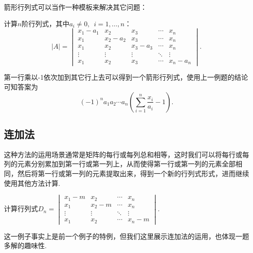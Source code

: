 箭形行列式可以当作一种模板来解决其它问题：

\begin{example}{}{}
    计算$n$阶行列式，其中$a_i\neq 0,\enspace i=1,\ldots,n$：
    \[|A|=\begin{vmatrix}
            x_1-a_1 & x_2     & x_3     & \cdots & x_n     \\
            x_1     & x_2-a_2 & x_3     & \cdots & x_n     \\
            x_1     & x_2     & x_3-a_3 & \cdots & x_n     \\
            \vdots  & \vdots  & \vdots  & \ddots & \vdots  \\
            x_1     & x_2     & x_3     & \cdots & x_n-a_n
        \end{vmatrix}.\]
\end{example}

\begin{solution}
    第一行乘以-1依次加到其它行上去可以得到一个箭形行列式，使用上一例题的结论可知答案为\[(-1)^na_1a_2\cdots a_n(\sum\limits_{i=1}^n\dfrac{x_i}{a_i}-1).\]
\end{solution}

\subsection{连加法}

这种方法的运用场景通常是矩阵的每行或每列总和相等，这时我们可以将每行或每列的元素分别累加到第一行或第一列上，从而使得第一行或第一列的元素全部相同，然后将第一行或第一列的元素提取出来，得到一个新的行列式形式，进而继续使用其他方法计算.

\begin{example}{}{}
    计算行列式$D_n=\begin{vmatrix}
            x_1-m  & x_2    & \cdots & x_n    \\
            x_1    & x_2-m  & \cdots & x_n    \\
            \vdots & \vdots & \ddots & \vdots \\
            x_1    & x_2    & \cdots & x_n-m
        \end{vmatrix}$.
\end{example}

这一例子事实上是前一个例子的特例，但我们这里展示连加法的运用，也体现一题多解的趣味性.

